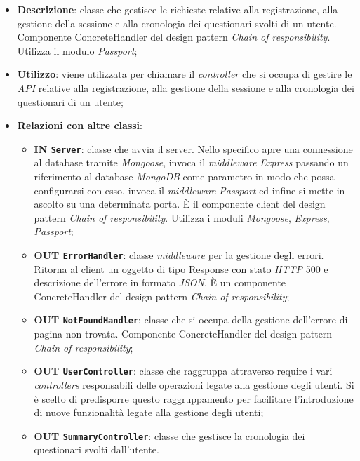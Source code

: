 	\begin{itemize}
		\item \textbf{Descrizione}: classe che gestisce le richieste relative alla registrazione, alla gestione della sessione e alla cronologia dei questionari svolti di un utente.
Componente ConcreteHandler del design pattern \textit{Chain of responsibility}. Utilizza il modulo \textit{Passport};
		\item \textbf{Utilizzo}: viene utilizzata per chiamare il \textit{controller} che si occupa di gestire le \textit{API} relative alla registrazione, alla gestione della sessione e alla cronologia dei questionari di un utente;
		\item \textbf{Relazioni con altre classi}:
		\begin{itemize}
		\item 
			\textbf{IN	\texttt{Server}}: classe che avvia il server. Nello specifico apre una connessione al database tramite \textit{Mongoose}, invoca il \textit{middleware} \textit{Express} passando un riferimento al database \textit{MongoDB} come parametro in modo che possa configurarsi con esso, invoca il \textit{middleware} \textit{Passport} ed infine si mette in ascolto su una determinata porta. È il componente client del design pattern \textit{Chain of responsibility}. Utilizza i moduli \textit{Mongoose}, \textit{Express}, \textit{Passport}; 
		\item 
		\textbf{	OUT \texttt{ErrorHandler}}: classe \textit{middleware} per la gestione degli errori. Ritorna al client un oggetto di tipo Response con stato \textit{HTTP} 500 e descrizione dell’errore in formato \textit{JSON}. È un
componente ConcreteHandler del design pattern \textit{Chain of responsibility};
		\item 
			\textbf{OUT \texttt{NotFoundHandler}}: classe che si occupa della gestione dell’errore di pagina non trovata. Componente ConcreteHandler del design pattern \textit{Chain of responsibility};
		\item 
			\textbf{OUT \texttt{UserController}}: classe che raggruppa attraverso require i vari \textit{controllers}  responsabili delle operazioni legate alla gestione degli utenti. Si è scelto di predisporre questo raggruppamento per facilitare l'introduzione di nuove funzionalità legate alla gestione degli utenti;
		\item 
		\textbf{	OUT \texttt{SummaryController}}: classe che gestisce la cronologia dei questionari svolti dall'utente.

\end{itemize}
\end{itemize}
